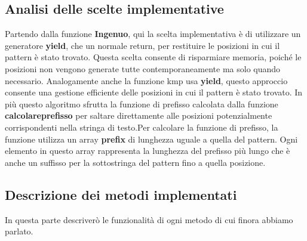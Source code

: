 \subsection{Analisi delle scelte implementative}
\label{sec:AnalisiScelteImplementative_1}
Partendo dalla funzione \textbf{Ingenuo}, qui la scelta implementativa è di utilizzare un generatore \textbf{yield}, che un normale return, per restituire le posizioni in cui il pattern è stato trovato. Questa scelta consente di risparmiare memoria, poiché le posizioni non vengono generate tutte contemporaneamente ma solo quando necessario. Analogamente anche la funzione kmp usa \textbf{yield}, questo approccio consente una gestione efficiente delle posizioni in cui il pattern è stato trovato. In più questo algoritmo sfrutta la funzione di prefisso calcolata dalla funzione \textbf{calcolareprefisso} per saltare direttamente alle posizioni potenzialmente corrispondenti nella stringa di testo.Per calcolare la funzione di prefisso, la funzione utilizza un array \textbf{prefix} di lunghezza uguale a quella del pattern. Ogni elemento in questo array rappresenta la lunghezza del prefisso più lungo che è anche un suffisso per la sottostringa del pattern fino a quella posizione.
 
\subsection{Descrizione dei metodi implementati}
\label{sec:DescrizioneMetodiImplementati_1}
In questa parte descriverò le funzionalità di ogni metodo di cui finora abbiamo parlato.

